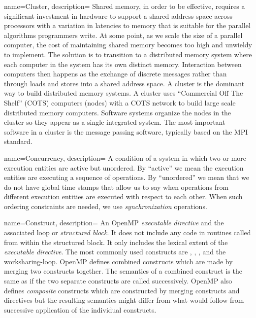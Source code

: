 {
   name={Cluster},
   description={
   Shared memory, in order to be effective, requires a significant investment in hardware to support 
   a shared address space across processors with a variation in latencies to memory that is
   suitable for the parallel algorithms programmers write. 
   At some point, as we scale the size
   of a parallel computer, the cost of maintaining shared memory becomes too high and unwieldy
   to implement.  The solution is to transition to a distributed memory system where each computer in 
   the system has its own distinct memory.  Interaction between computers then happens as the exchange
   of discrete messages rather than through loads and stores into a shared address space.    A cluster
   is the dominant way to build distributed memory systems.  A cluster uses ``Commercial Off The Shelf''
   (COTS) computers (nodes) with a COTS network to build large scale distributed memory computers.  Software
   systems organize the nodes in the cluster so they appear as a single integrated system.  The most important
   software in a cluster is the message passing software, typically based on the MPI standard.
   }
}   



{
   name={Concurrency},
   description={
   A condition of a system in which two or more execution entities are active but unordered.  By ``active'' we mean the
   execution entities are executing a sequence of operations.  By ``unordered'' we mean that we do not have 
   global time stamps that allow us to say when operations from different execution entities are executed with respect 
   to each other.  When such ordering constraints are needed, we use \emph{synchronization} operations.
      }
}   



{
   name={Construct},
   description={
An OpenMP \emph{executable directive} and the associated loop or \emph{structured block}.  It does not
include any code in routines called from within the structured block.  It only includes the lexical extent of 
the \emph{executable directive}.  The most commonly used constructs are , 
, ,  and the worksharing-loop.  OpenMP defines combined constructs which
are made by merging two constructs together.  The semantics of a combined construct is the same as if 
the two separate constructs are called successively.  OpenMP also defines \emph{composite} constructs which
are constructed by merging constructs and directives but the resulting semantics might differ from what would follow
from successive application of the individual constructs. }
}

